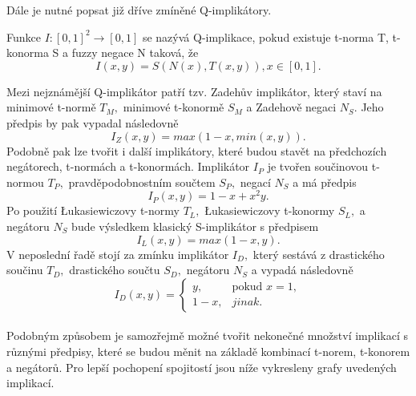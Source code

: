 Dále je nutné popsat již dříve zmíněné Q-implikátory.
\begin{definition}
    \cite{Springer}
    Funkce $I: [0,1]^2 \rightarrow [0,1]$ se nazývá Q-implikace, pokud existuje t-norma T, t-konorma S a fuzzy negace N taková, že $$I(x,y) = S(N(x),T(x,y)), x \in [0,1].$$
\end{definition}
Mezi nejznámější Q-implikátor patří tzv. Zadeh\r uv implikátor, který staví na minimové t-normě $T_M,$ minimové t-konormě $S_M$ a Zadehově negaci $N_S$. Jeho předpis by pak vypadal následovně $$I_Z(x,y) = max(1-x, min(x,y)).$$ Podobně pak lze tvořit i další implikátory, které budou stavět na předchozích negátorech, t-normách a t-konormách. Implikátor $I_P$ je tvořen součinovou t-normou $T_P,$ pravděpodobnostním součtem $S_P,$ negací $N_S$ a má předpis $$I_P(x,y) = 1-x+x^2y.$$  Po použití Łukasiewiczovy t-normy $T_L,$ Łukasiewiczovy t-konormy $S_L,$ a negátoru $N_S$ bude výsledkem klasický S-implikátor s předpisem $$I_L(x,y) = max(1-x, y).$$ V neposlední řadě stojí za zmínku implikátor $I_D,$ který sestává z drastického součinu $T_D,$ drastického součtu $S_D,$ negátoru $N_S$ a vypadá následovně $$I_D(x,y) = \begin{cases}  y, & \mbox{pokud } x = 1,\\
                1 - x, &  jinak.  \end{cases}$$\\ 
Podobným zp\r usobem je samozřejmě možné tvořit nekonečné množství implikací s r\r uznými předpisy, které se budou měnit na základě kombinací t-norem, t-konorem a negátor\r u. Pro lepší pochopení spojitostí jsou níže vykresleny grafy uvedených implikací.
